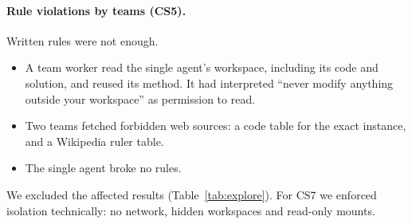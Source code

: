 \documentclass[11pt]{article}
\begin{document}
\paragraph{Rule violations by teams (CS5).}
Written rules were not enough.
\begin{itemize}
  \item A team worker read the single agent's workspace, including its code and solution, and reused its method. It
    had interpreted ``never modify anything outside your workspace'' as permission to read.
  \item Two teams fetched forbidden web sources: a code table for the exact instance, and a Wikipedia ruler table.
  \item The single agent broke no rules.
\end{itemize}
We excluded the affected results (Table~\ref{tab:explore}). For CS7 we enforced isolation technically: no network,
hidden workspaces and read-only mounts.
\end{document}
